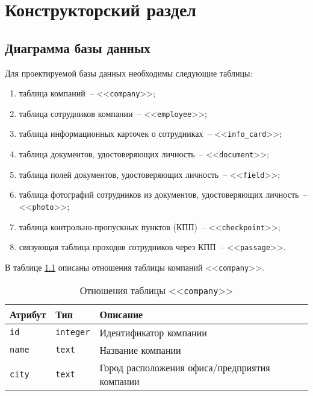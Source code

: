 \chapter{Конструкторский раздел}
	
\section{Диаграмма базы данных}



Для проектируемой базы данных необходимы следующие таблицы:
\begin{enumerate}
	\item таблица компаний~-- <<\texttt{company}>>;
	\item таблица сотрудников компании~-- <<\texttt{employee}>>;
	\item таблица информационных карточек о сотрудниках~-- <<\texttt{info\_card}>>;
	\item таблица документов, удостоверяющих личность~-- <<\texttt{document}>>;
	\item таблица полей документов, удостоверяющих личность~-- <<\texttt{field}>>;
	\item таблица фотографий сотрудников из документов, удостоверяющих личность~-- <<\texttt{photo}>>;
	\item таблица контрольно-пропускных пунктов (КПП)~-- <<\texttt{checkpoint}>>;
	\item связующая таблица проходов сотрудников через КПП~-- <<\texttt{passage}>>.
\end{enumerate}

В таблице \ref{table:companyCols} описаны отношения таблицы компаний <<\texttt{company}>>.
\begin{table}[h!]
	\begin{center}
		\caption{\label{table:companyCols} Отношения таблицы <<\texttt{company}>>}
		\begin{tabularx}{\textwidth}{|X|X|X|}
			\hline
			Атрибут & Тип & Описание \\ \hline
			\texttt{id} & \texttt{integer} & Идентификатор компании \\ \hline
			\texttt{name} & \texttt{text} & Название компании \\ \hline
			\texttt{city} & \texttt{text} & Город расположения офиса/предприятия компании \\ \hline
		\end{tabularx}
	\end{center}
\end{table}

